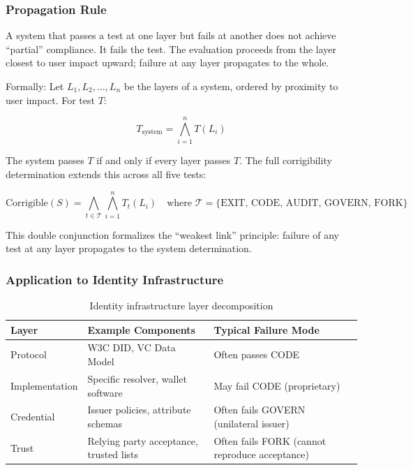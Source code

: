 \documentclass{article}
\begin{document}
\subsubsection{Propagation Rule}

A system that passes a test at one layer but fails at another does not achieve ``partial'' compliance. It fails the test. The evaluation proceeds from the layer closest to user impact upward; failure at any layer propagates to the whole.

Formally: Let $L_1, L_2, \ldots, L_n$ be the layers of a system, ordered by proximity to user impact. For test $T$:

\begin{equation}
T_{\text{system}} = \bigwedge_{i=1}^{n} T(L_i)
\label{eq:layer-propagation}
\end{equation}

The system passes $T$ if and only if every layer passes $T$. The full corrigibility determination extends this across all five tests:

\begin{equation}
\text{Corrigible}(S) = \bigwedge_{t \in \mathcal{T}} \bigwedge_{i=1}^{n} T_t(L_i) \quad \text{where } \mathcal{T} = \{\text{EXIT, CODE, AUDIT, GOVERN, FORK}\}
\label{eq:full-corrigibility}
\end{equation}

This double conjunction formalizes the ``weakest link'' principle: failure of any test at any layer propagates to the system determination.

\subsubsection{Application to Identity Infrastructure}

\begin{table}[htbp]
\centering
\small
\begin{tabular}{@{}llp{5cm}@{}}
\toprule
\textbf{Layer} & \textbf{Example Components} & \textbf{Typical Failure Mode} \\
\midrule
Protocol & W3C DID, VC Data Model & Often passes CODE \\
Implementation & Specific resolver, wallet software & May fail CODE (proprietary) \\
Credential & Issuer policies, attribute schemas & Often fails GOVERN (unilateral issuer) \\
Trust & Relying party acceptance, trusted lists & Often fails FORK (cannot reproduce acceptance) \\
\bottomrule
\end{tabular}
\caption{Identity infrastructure layer decomposition}
\label{tab:identity_layers}
\end{table}
\end{document}
